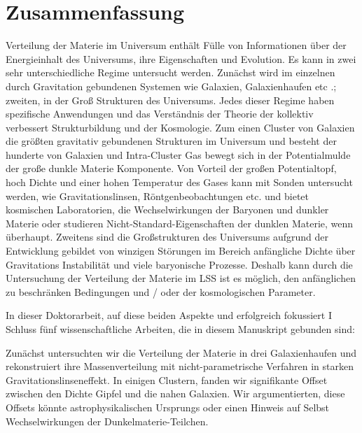 {}

\chapter*{Zusammenfassung}%

Verteilung der Materie im Universum enthält Fülle von Informationen über
der Energieinhalt des Universums, ihre Eigenschaften und Evolution. Es kann
in zwei sehr unterschiedliche Regime untersucht werden. Zunächst wird im einzelnen durch Gravitation
gebundenen Systemen wie Galaxien, Galaxienhaufen etc .; zweiten, in der
Groß Strukturen des Universums. Jedes dieser Regime haben spezifische
Anwendungen und das Verständnis der Theorie der kollektiv verbessert
Strukturbildung und der Kosmologie. Zum einen Cluster von Galaxien
die größten gravitativ gebundenen Strukturen im Universum und besteht
der hunderte von Galaxien und Intra-Cluster Gas bewegt sich in der Potentialmulde
der große dunkle Materie Komponente. Von Vorteil der großen Potentialtopf, hoch
Dichte und einer hohen Temperatur des Gases kann mit Sonden untersucht werden, wie
Gravitationslinsen, Röntgenbeobachtungen etc. und bietet kosmischen
Laboratorien, die Wechselwirkungen der Baryonen und dunkler Materie oder studieren
Nicht-Standard-Eigenschaften der dunklen Materie, wenn überhaupt.
Zweitens sind die Großstrukturen des Universums aufgrund der Entwicklung gebildet
von winzigen Störungen im Bereich anfängliche Dichte über Gravitations
Instabilität und viele baryonische Prozesse. Deshalb kann durch die Untersuchung der
Verteilung der Materie im LSS ist es möglich, den anfänglichen zu beschränken
Bedingungen und / oder der kosmologischen Parameter.

In dieser Doktorarbeit, auf diese beiden Aspekte und erfolgreich fokussiert I
Schluss fünf wissenschaftliche Arbeiten, die in diesem Manuskript gebunden sind:

Zunächst untersuchten wir die Verteilung der Materie in drei Galaxienhaufen
und rekonstruiert ihre Massenverteilung mit nicht-parametrische Verfahren in
starken Gravitationslinseneffekt. In einigen Clustern, fanden wir signifikante Offset
zwischen den Dichte Gipfel und die nahen Galaxien. Wir argumentierten, diese Offsets
könnte astrophysikalischen Ursprungs oder einen Hinweis auf Selbst Wechselwirkungen
der Dunkelmaterie-Teilchen.

